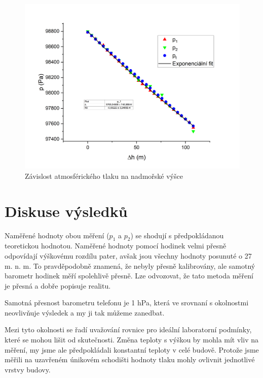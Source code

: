 \begin{figure}[h]
    \centering
    \includegraphics[width=1\linewidth]{Y1 - Závislost atmosférického tlaku na výšce – výletní//Protokol - závislost atmosférického tlaku na výšce – výletní//img/Závislost tlaku na výšce.png}
    \caption{Závislost atmosférického tlaku na nadmořské výšce}
    \label{fig:tlak-na-vysce}
\end{figure}

\newpage
\section{Diskuse výsledků}

Naměřené hodnoty obou měření ($p_1$ a $p_2$) se shodují s předpokládanou teoretickou hodnotou. Naměřené hodnoty pomocí hodinek velmi přesně odpovídají výškovému rozdílu pater, avšak jsou všechny hodnoty posunuté o 27 m. n. m. To pravděpodobně znamená, že nebyly přesně kalibrovány, ale samotný barometr hodinek měří spolehlivě přesně. Lze odvozovat, že tato metoda měření je přesná a dobře popisuje realitu.

Samotná přesnost barometru telefonu je 1 hPa, která ve srovnaní s okolnostmi neovlivňuje výsledek a my ji tak můžeme zanedbat.

Mezi tyto okolnosti se řadí uvažování rovnice pro ideální laboratorní podmínky, které se mohou lišit od skutečnosti. Změna teploty s výškou by mohla mít vliv na měření, my jsme ale předpokládali konstantní teploty v celé budově. Protože jsme měřili na uzavřeném únikovém schodišti hodnoty tlaku mohly ovlivnit jednotlivé vrstvy budovy.

